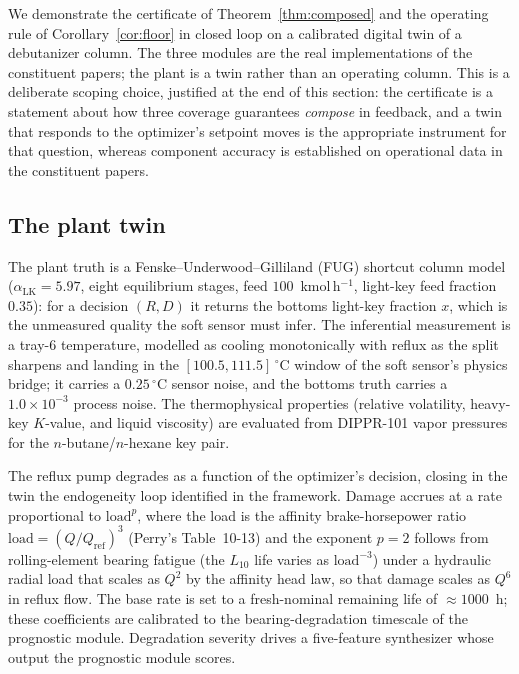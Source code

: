 \documentclass[review,12pt]{elsarticle}
\theoremstyle{definition}
\begin{document}
We demonstrate the certificate of Theorem~\ref{thm:composed} and the operating
rule of Corollary~\ref{cor:floor} in closed loop on a calibrated digital twin of a
debutanizer column. The three modules are the real implementations of the
constituent papers; the plant is a twin rather than an operating column. This is
a deliberate scoping choice, justified at the end of this section: the certificate
is a statement about how three coverage guarantees \emph{compose} in feedback, and
a twin that responds to the optimizer's setpoint moves is the appropriate
instrument for that question, whereas component accuracy is established on
operational data in the constituent papers.

\subsection{The plant twin}
\label{sec:twin}

The plant truth is a Fenske--Underwood--Gilliland (FUG) shortcut column model
($\alpha_{\mathrm{LK}}=5.97$, eight equilibrium stages, feed $100$~kmol\,h$^{-1}$,
light-key feed fraction $0.35$): for a decision $(R,D)$ it returns the bottoms
light-key fraction $x$, which is the unmeasured quality the soft sensor must
infer. The inferential measurement is a tray-6 temperature, modelled as cooling
monotonically with reflux as the split sharpens and landing in the
$[100.5, 111.5]\,^\circ$C window of the soft sensor's physics bridge; it carries a
$0.25\,^\circ$C sensor noise, and the bottoms truth carries a
$1.0\times10^{-3}$ process noise. The thermophysical properties (relative
volatility, heavy-key $K$-value, and liquid viscosity) are evaluated from
DIPPR-101 vapor pressures for the $n$-butane/$n$-hexane key pair.

The reflux pump degrades as a function of the optimizer's decision, closing in the
twin the endogeneity loop identified in the framework. Damage accrues at a rate
proportional to $\mathrm{load}^{p}$, where the load is the affinity brake-horsepower
ratio $\mathrm{load} = (Q/Q_{\mathrm{ref}})^{3}$ (Perry's Table~10-13) and the
exponent $p=2$ follows from rolling-element bearing fatigue (the $L_{10}$ life
varies as $\mathrm{load}^{-3}$) under a hydraulic radial load that scales as $Q^{2}$
by the affinity head law, so that damage scales as $Q^{6}$ in reflux flow. The base
rate is set to a fresh-nominal remaining life of $\approx\!1000$~h; these
coefficients are calibrated to the bearing-degradation timescale of the prognostic
module. Degradation severity drives a five-feature synthesizer whose output the
prognostic module scores.
\end{document}
